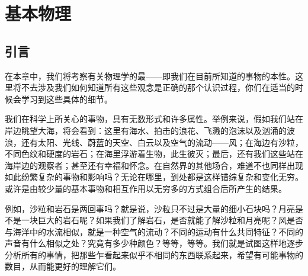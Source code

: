 
\setcounter{chapter}{1}
\chapter{基本物理}


\section{引言}

在本章中，我们将考察有关物理学的最——即我们在目前所知道的事物的本性。这里将不去涉及我们如何知道所有这些观念是正确的那个认识过程，你们在适当的时候会学习到这些具体的细节。

我们在科学上所关心的事物，具有无数形式和许多属性。举例来说，假如我们站在岸边眺望大海，将会看到：这里有海水、拍击的浪花、飞溅的泡沫以及汹涌的波浪，还有太阳、光线、蔚蓝的天空、白云以及空气的流动——风；在海边有沙粒，不同色纹和硬度的岩石；在海里浮游着生物，此生彼灭；最后，还有我们这些站在海岸边的观察者；甚至还有幸福和怀念。在自然界的其他场合，难道不也同样出现如此纷繁复杂的事物和影响吗？无论在哪里，到处都是这样错综复杂和变化无穷。或许是由较少量的基本事物和相互作用以无穷多的方式组合后所产生的结果。

例如，沙粒和岩石是两回事吗？就是说，沙粒只不过是大量的细小石块吗？月亮是不是一块巨大的岩石呢？如果我们了解岩石，是否就能了解沙粒和月亮呢？风是否与海洋中的水流相似，就是一种空气的流动？不同的运动有什么共同特征？不同的声音有什么相似之处？究竟有多少种颜色？等等，等等。我们就是试图这样地逐步分析所有的事情，把那些乍看起来似乎不相同的东西联系起来，希望有可能事物的数目，从而能更好的理解它们。

